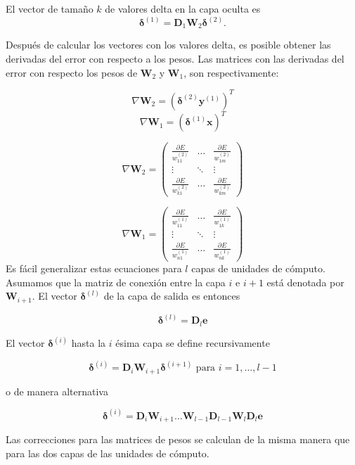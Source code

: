 El vector de tamaño $k$ de valores delta en la capa oculta es
\[
\boldsymbol{\delta}^{(1)} = \mathbf{D}_1\mathbf{W}_2 \boldsymbol{\delta}^{(2)}.
\]

Después de calcular los vectores con los valores delta, es posible
obtener las derivadas del error con respecto a los pesos.
Las matrices con las derivadas del error con respecto los pesos de $\mathbf{W}_2$
y $\mathbf{W}_1$, son respectivamente:

\[
\nabla \mathbf{W}_2 = (\boldsymbol{\delta}^{(2)}\mathbf{y}^{(1)})^T
\]
\[
\nabla \mathbf{W}_1 = (\boldsymbol{\delta}^{(1)}\mathbf{x})^T
\]

\[
\nabla\mathbf{W}_2 = 
\begin{pmatrix}
    \frac{\partial E}{w_{11}^{(2)}} & \dots & \frac{\partial E}{w_{1m}^{(2)}} \\
    \vdots & \ddots & \vdots\\
    \frac{\partial E}{w_{k1}^{(2)}} & \dots & \frac{\partial E}{w_{km}^{(2)}}
\end{pmatrix}
\]  

\[
\nabla\mathbf{W}_1 = 
\begin{pmatrix}
    \frac{\partial E}{w_{11}^{(1)}} & \dots & \frac{\partial E}{w_{1k}^{(1)}} \\
    \vdots & \ddots & \vdots\\
    \frac{\partial E}{w_{n1}^{(1)}} & \dots & \frac{\partial E}{w_{nk}^{(1)}}
\end{pmatrix}
\]  
Es fácil generalizar estas ecuaciones para $l$ capas de unidades de cómputo. Asumamos que la matriz
de conexión entre la capa $i$ e $i+1$ está denotada por $\mathbf{W}_{i+1}$. El vector
$\mathbf{\delta}^{(l)}$ de la capa de salida es entonces

\[
\boldsymbol{\delta}^{(l)} = \mathbf{D}_l\mathbf{e}
\]

El vector
$\mathbf{\delta}^{(i)}$ hasta la $i$ ésima capa se define recursivamente

\[
\boldsymbol{\delta}^{(i)} = \mathbf{D}_i\mathbf{W}_{i+1} \boldsymbol{\delta}^{(i+1)} \mbox{ para } i = 1, \dots, l - 1
\]

o de manera alternativa

\[
\boldsymbol{\delta}^{(i)} = \mathbf{D}_i\mathbf{W}_{i+1} \dots \mathbf{W}_{l-1}\mathbf{D}_{l-1}\mathbf{W}_l\mathbf{D}_{l} \mathbf{e}
\]

Las correcciones para las matrices de pesos se calculan de la misma manera que para las dos
capas de las unidades de cómputo.


